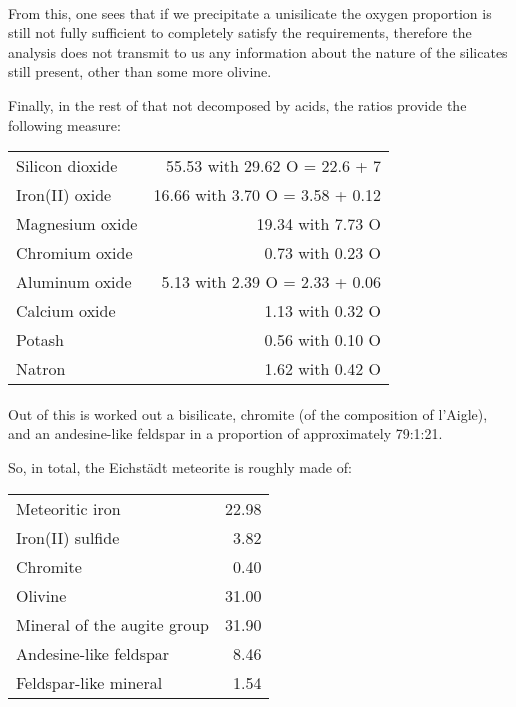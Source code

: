 \documentclass[a4paper, 12pt, oneside]{article}
\begin{document}
\paragraph{}
From this, one sees that if we precipitate a unisilicate the oxygen proportion is still not fully sufficient to completely satisfy the requirements, therefore the analysis does not transmit to us any information about the nature of the silicates still present, other than some more olivine.

Finally, in the rest of that not decomposed by acids, the ratios provide the following measure:
\begin{center}
    \begin{tabular}{l r}
        Silicon dioxide & 55.53 with 29.62 O = 22.6 + 7\\
        Iron(II) oxide & 16.66 with 3.70 O = 3.58 + 0.12\\
        Magnesium oxide & 19.34 with 7.73 O\\
        Chromium oxide & 0.73 with 0.23 O\\
        Aluminum oxide & 5.13 with 2.39 O = 2.33 + 0.06\\
        Calcium oxide & 1.13 with 0.32 O\\
        Potash & 0.56 with 0.10 O\\
        Natron & 1.62 with 0.42 O\\
    \end{tabular}
\end{center}
\paragraph{}
Out of this is worked out a bisilicate, chromite (of the composition of l'Aigle), and an andesine-like feldspar in a proportion of approximately 79:1:21.

So, in total, the Eichstädt meteorite is roughly made of:
\begin{center}
    \begin{tabular}{l r}
        Meteoritic iron & 22.98\\
        Iron(II) sulfide & 3.82\\
        Chromite & 0.40\\
        Olivine & 31.00\\
        Mineral of the augite group & 31.90\\
        Andesine-like feldspar & 8.46\\
        Feldspar-like mineral & 1.54\\
    \end{tabular}
\end{center}
\end{document}
